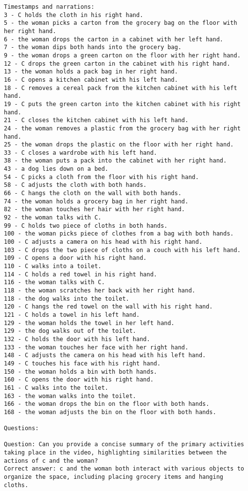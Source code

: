 \begin{lstlisting}
Timestamps and narrations:
3 - C holds the cloth in his right hand.
5 - the woman picks a carton from the grocery bag on the floor with her right hand.
6 - the woman drops the carton in a cabinet with her left hand.
7 - the woman dips both hands into the grocery bag.
9 - the woman drops a green carton on the floor with her right hand.
12 - C drops the green carton in the cabinet with his right hand.
13 - the woman holds a pack bag in her right hand.
16 - C opens a kitchen cabinet with his left hand.
18 - C removes a cereal pack from the kitchen cabinet with his left hand.
19 - C puts the green carton into the kitchen cabinet with his right hand.
21 - C closes the kitchen cabinet with his left hand.
24 - the woman removes a plastic from the grocery bag with her right hand.
25 - the woman drops the plastic on the floor with her right hand.
33 - C closes a wardrobe with his left hand.
38 - the woman puts a pack into the cabinet with her right hand.
43 - a dog lies down on a bed.
54 - C picks a cloth from the floor with his right hand.
58 - C adjusts the cloth with both hands.
66 - C hangs the cloth on the wall with both hands.
74 - the woman holds a grocery bag in her right hand.
82 - the woman touches her hair with her right hand.
92 - the woman talks with C.
99 - C holds two piece of cloths in both hands.
100 - the woman picks piece of clothes from a bag with both hands.
100 - C adjusts a camera on his head with his right hand.
103 - C drops the two piece of cloths on a couch with his left hand.
109 - C opens a door with his right hand.
110 - C walks into a toilet.
114 - C holds a red towel in his right hand.
116 - the woman talks with C.
118 - the woman scratches her back with her right hand.
118 - the dog walks into the toilet.
120 - C hangs the red towel on the wall with his right hand.
121 - C holds a towel in his left hand.
129 - the woman holds the towel in her left hand.
129 - the dog walks out of the toilet.
132 - C holds the door with his left hand.
133 - the woman touches her face with her right hand.
148 - C adjusts the camera on his head with his left hand.
149 - C touches his face with his right hand.
150 - the woman holds a bin with both hands.
160 - C opens the door with his right hand.
161 - C walks into the toilet.
163 - the woman walks into the toilet.
166 - the woman drops the bin on the floor with both hands.
168 - the woman adjusts the bin on the floor with both hands.

Questions:

Question: Can you provide a concise summary of the primary activities taking place in the video, highlighting similarities between the actions of c and the woman?
Correct answer: c and the woman both interact with various objects to organize the space, including placing grocery items and hanging cloths.


\end{lstlisting}
